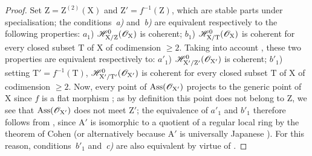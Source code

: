 \begin{proof}
Set $\mathrm{Z}=\mathrm{Z}^{(2)}(\mathrm{X})$  and $\mathrm{Z}'=f^{-1}(\mathrm{Z})$, which are stable parts under specialisation; the conditions~\emph{a)} and~\emph{b)} are equivalent respectively to the following properties:
$a_1$) $\mathscr{H}^0_{\mathrm{X}/\mathrm{Z}}(\mathscr{O}_\mathrm{X})$ is coherent;
$b_1$) $\mathscr{H}^0_{\mathrm{X}/\mathrm{T}}(\mathscr{O}_\mathrm{X})$ is coherent for every closed subset $\mathrm{T}$ of $\mathrm{X}$ of codimension $\geqslant 2$.
Taking into account , these two properties are equivalent respectively to:
$a'_1$) $\mathscr{H}^0_{\mathrm{X}'/\mathrm{Z}'}(\mathscr{O}_{\mathrm{X}'})$ is coherent;
$b'_1$) setting $\mathrm{T}'=f^{-1}(\mathrm{T})$, $\mathscr{H}^0_{\mathrm{X}'/\mathrm{T}'}(\mathscr{O}_{\mathrm{X}'})$ is coherent for every closed subset $\mathrm{T}$ of $\mathrm{X}$ of codimension $\geqslant 2$.
Now, every point of $\operatorname{Ass}(\mathscr{O}_{\mathrm{X}'})$ projects to the generic point of $\mathrm{X}$ since $f$ is a flat morphism ; as by definition this point does not belong to $\mathrm{Z}$, we see that $\operatorname{Ass}(\mathscr{O}_{\mathrm{X}'})$ does not meet $\mathrm{Z}'$; the equivalence of $a'_1$ and $b'_1$ therefore follows from , since $\mathrm{A}'$ is isomorphic to a quotient of a regular local ring by the theorem of Cohen  (or alternatively
because $\mathrm{A}'$ is universally Japanese ).
For this reason, conditions~$b'_1$ and~\emph{c)} are also equivalent by virtue of .
\end{proof}

